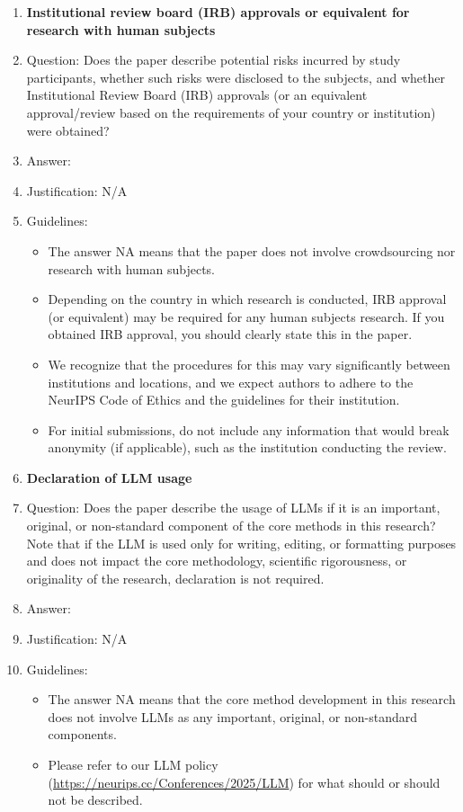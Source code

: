 \documentclass{article}
\begin{document}
\begin{enumerate}
\item {\bf Institutional review board (IRB) approvals or equivalent for research with human subjects}
    \item[] Question: Does the paper describe potential risks incurred by study participants, whether such risks were disclosed to the subjects, and whether Institutional Review Board (IRB) approvals (or an equivalent approval/review based on the requirements of your country or institution) were obtained?
    \item[] Answer: \answerNA{} %
    \item[] Justification: N/A
    \item[] Guidelines:
    \begin{itemize}
        \item The answer NA means that the paper does not involve crowdsourcing nor research with human subjects.
        \item Depending on the country in which research is conducted, IRB approval (or equivalent) may be required for any human subjects research. If you obtained IRB approval, you should clearly state this in the paper. 
        \item We recognize that the procedures for this may vary significantly between institutions and locations, and we expect authors to adhere to the NeurIPS Code of Ethics and the guidelines for their institution. 
        \item For initial submissions, do not include any information that would break anonymity (if applicable), such as the institution conducting the review.
    \end{itemize}

\item {\bf Declaration of LLM usage}
    \item[] Question: Does the paper describe the usage of LLMs if it is an important, original, or non-standard component of the core methods in this research? Note that if the LLM is used only for writing, editing, or formatting purposes and does not impact the core methodology, scientific rigorousness, or originality of the research, declaration is not required.
    \item[] Answer: \answerNA{} %
    \item[] Justification: N/A
    \item[] Guidelines:
    \begin{itemize}
        \item The answer NA means that the core method development in this research does not involve LLMs as any important, original, or non-standard components.
        \item Please refer to our LLM policy (\url{https://neurips.cc/Conferences/2025/LLM}) for what should or should not be described.
    \end{itemize}

\end{enumerate}
\end{document}
